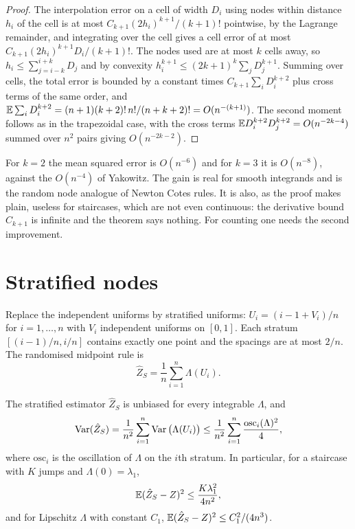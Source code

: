 \begin{proof}
The interpolation error on a cell of width $D_i$ using nodes within distance $h_i$ of the cell is at most $C_{k+1} (2 h_i)^{k+1} / (k+1)!$ pointwise, by the Lagrange remainder, and integrating over the cell gives a cell error of at most $C_{k+1} (2 h_i)^{k+1} D_i / (k+1)!$. The nodes used are at most $k$ cells away, so $h_i \le \sum_{j = i - k}^{i + k} D_j$ and by convexity $h_i^{k+1} \le (2k+1)^{k} \sum_j D_j^{k+1}$. Summing over cells, the total error is bounded by a constant times $C_{k+1} \sum_i D_i^{k+2}$ plus cross terms of the same order, and $\mathbb{E} \sum_i D_i^{k+2} = (n+1) (k+2)! \, n! / (n+k+2)! = O(n^{-(k+1)})$. The second moment follows as in the trapezoidal case, with the cross terms $\mathbb{E} D_i^{k+2} D_j^{k+2} = O(n^{-2k-4})$ summed over $n^2$ pairs giving $O(n^{-2k-2})$.
\end{proof}

For $k = 2$ the mean squared error is $O(n^{-6})$ and for $k = 3$ it is $O(n^{-8})$, against the $O(n^{-4})$ of Yakowitz. The gain is real for smooth integrands and is the random node analogue of Newton Cotes rules. It is also, as the proof makes plain, useless for staircases, which are not even continuous: the derivative bound $C_{k+1}$ is infinite and the theorem says nothing. For counting one needs the second improvement.

\section{Stratified nodes}

Replace the independent uniforms by stratified uniforms: $U_i = (i - 1 + V_i) / n$ for $i = 1, \dots, n$ with $V_i$ independent uniforms on $[0, 1]$. Each stratum $[(i-1)/n, i/n]$ contains exactly one point and the spacings are at most $2/n$. The randomised midpoint rule is
\[
\hat Z_S = \frac{1}{n} \sum_{i=1}^{n} \Lambda(U_i) .
\]

\begin{theorem}
\label{thm:stratified}
The stratified estimator $\hat Z_S$ is unbiased for every integrable $\Lambda$, and
\[
\operatorname{Var} (\hat Z_S) = \frac{1}{n^2} \sum_{i=1}^{n} \operatorname{Var} \big( \Lambda(U_i) \big) \le \frac{1}{n^2} \sum_{i=1}^{n} \frac{ \mathrm{osc}_i(\Lambda)^2 }{4} ,
\]
where $\mathrm{osc}_i$ is the oscillation of $\Lambda$ on the $i$th stratum. In particular, for a staircase with $K$ jumps and $\Lambda(0) = \lambda_1$,
\[
\mathbb{E} (\hat Z_S - Z)^2 \le \frac{K \lambda_1^2}{4 n^2} ,
\]
and for Lipschitz $\Lambda$ with constant $C_1$, $\mathbb{E} (\hat Z_S - Z)^2 \le C_1^2 / (4 n^3)$.
\end{theorem}

